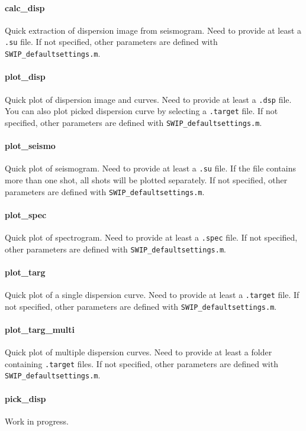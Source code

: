 \documentclass[twoside,a4paper]{article}
\begin{document}
\paragraph{calc\_disp}
Quick extraction of dispersion image from seismogram. Need to provide at least a \verb|.su| file. If not specified, other parameters are defined with \verb|SWIP_defaultsettings.m|.

\paragraph{plot\_disp}
Quick plot of dispersion image and curves. Need to provide at least a \verb|.dsp| file. You can also plot picked dispersion curve by selecting a \verb|.target| file. If not specified, other parameters are defined with \verb|SWIP_defaultsettings.m|.

\paragraph{plot\_seismo}
Quick plot of seismogram. Need to provide at least a \verb|.su| file. If the file contains more than one shot, all shots will be plotted separately. If not specified, other parameters are defined with \verb|SWIP_defaultsettings.m|.

\paragraph{plot\_spec}
Quick plot of spectrogram. Need to provide at least a \verb|.spec| file. If not specified, other parameters are defined with \verb|SWIP_defaultsettings.m|.

\paragraph{plot\_targ}
Quick plot of a single dispersion curve. Need to provide at least a \verb|.target| file. If not specified, other parameters are defined with \verb|SWIP_defaultsettings.m|.

\paragraph{plot\_targ\_multi}
Quick plot of multiple dispersion curves. Need to provide at least a folder containing \verb|.target| files. If not specified, other parameters are defined with \verb|SWIP_defaultsettings.m|.

\paragraph{pick\_disp}
Work in progress.
\end{document}
